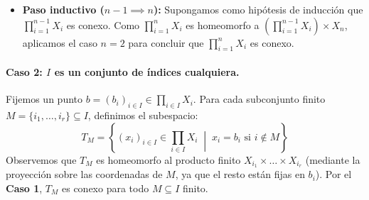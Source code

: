 \begin{dem}
\begin{itemize}
\begin{center}
        \end{center}
        
        Observemos que la intersección de ambos subespacios es no vacía:
        \[
            (\{x_1\} \times X_2) \cap (X_1 \times \{b_2\}) = \{(x_1, b_2)\} \neq \emptyset \text{}
        \]
        Por tanto, la «cruz» $T_{x_1} = (\{x_1\} \times X_2) \cup (X_1 \times \{b_2\}) \subseteq X_1 \times X_2$ es conexa por ser unión de dos subespacios conexos con intersección no vacía.
        
        Consideremos ahora la unión de todas estas cruces al variar $x_1 \in X_1$:
        \[
            \bigcup_{x_1 \in X_1} T_{x_1} = X_1 \times X_2 \text{}
        \]
        (ya que cualquier par $(x_1, x_2) \in \{x_1\} \times X_2 \subseteq T_{x_1}$). Además, todas las familias $\{T_{x_1}\}_{x_1 \in X_1}$ comparten el segmento horizontal:
        \[
            \bigcap_{x_1 \in X_1} T_{x_1} = X_1 \times \{b_2\} \neq \emptyset \text{}
        \]
        En consecuencia, $X_1 \times X_2 = \bigcup_{x_1 \in X_1} T_{x_1}$ es conexo al ser unión de subespacios conexos con intersección total no vacía.

        \item \textbf{Paso inductivo ($n-1 \implies n$):} Supongamos como hipótesis de inducción que $\prod_{i=1}^{n-1} X_i$ es conexo. Como $\prod_{i=1}^n X_i$ es homeomorfo a $\left(\prod_{i=1}^{n-1} X_i\right) \times X_n$, aplicamos el caso $n = 2$ para concluir que $\prod_{i=1}^n X_i$ es conexo.
    \end{itemize}

    \paragraph{Caso 2: $I$ es un conjunto de índices cualquiera.}
    Fijemos un punto $b = (b_i)_{i \in I} \in \prod_{i \in I} X_i$. Para cada subconjunto finito $M = \{i_1, \dots, i_r\} \subseteq I$, definimos el subespacio:
    \[
        T_M = \left\{ (x_i)_{i \in I} \in \prod_{i \in I} X_i \;\middle|\; x_i = b_i \text{ si } i \notin M \right\} \text{}
    \]
    Observemos que $T_M$ es homeomorfo al producto finito $X_{i_1} \times \dots \times X_{i_r}$ (mediante la proyección sobre las coordenadas de $M$, ya que el resto están fijas en $b_i$). Por el \textbf{Caso 1}, $T_M$ es conexo para todo $M \subseteq I$ finito.


\end{dem}
